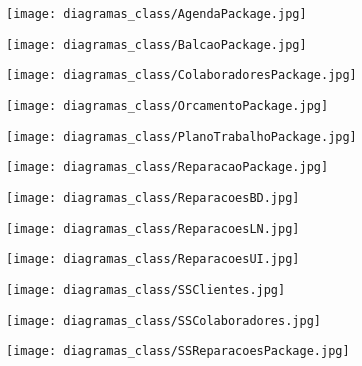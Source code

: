 \documentclass[relatorio.tex]{subfiles}
\begin{document}
\begin{landscape}
\begin{figure} \centering \texttt{[image: diagramas\_class/AgendaPackage.jpg]} \end{figure}
\begin{figure} \centering \texttt{[image: diagramas\_class/BalcaoPackage.jpg]} \end{figure}
\begin{figure} \centering \texttt{[image: diagramas\_class/ColaboradoresPackage.jpg]} \end{figure}
\begin{figure} \centering \texttt{[image: diagramas\_class/OrcamentoPackage.jpg]} \end{figure}
\begin{figure} \centering \texttt{[image: diagramas\_class/PlanoTrabalhoPackage.jpg]} \end{figure}
\begin{figure} \centering \texttt{[image: diagramas\_class/ReparacaoPackage.jpg]} \end{figure}
\begin{figure} \centering \texttt{[image: diagramas\_class/ReparacoesBD.jpg]} \end{figure}
\begin{figure} \centering \texttt{[image: diagramas\_class/ReparacoesLN.jpg]} \end{figure}
\begin{figure} \centering \texttt{[image: diagramas\_class/ReparacoesUI.jpg]} \end{figure}
\begin{figure} \centering \texttt{[image: diagramas\_class/SSClientes.jpg]} \end{figure}
\begin{figure} \centering \texttt{[image: diagramas\_class/SSColaboradores.jpg]} \end{figure}
\begin{figure} \centering \texttt{[image: diagramas\_class/SSReparacoesPackage.jpg]} \end{figure}

\end{landscape}
\end{document}
